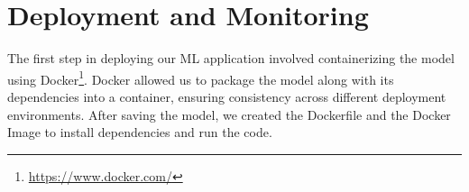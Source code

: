 



\section{Deployment and Monitoring}
The first step in deploying our ML application involved containerizing the model using Docker\footnote{\url{https://www.docker.com/}}. Docker allowed us to package the model along with its dependencies into a container, ensuring consistency across different deployment environments. After saving the model, we created the Dockerfile and the Docker Image to install dependencies and run the code.


